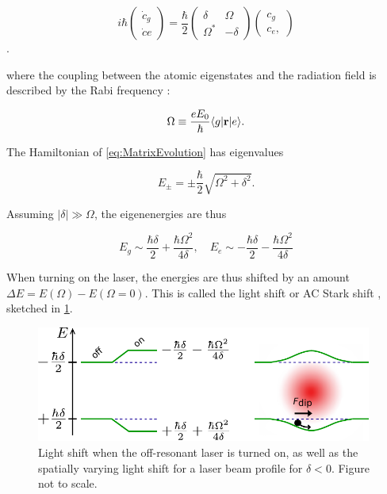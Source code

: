 \begin{equation}\label{eq:MatrixEvolution}
	i \hbar \begin{pmatrix}
		\dot{c}_g \\ 
		\dot{c}e
	\end{pmatrix}
	= \frac{\hbar}{2} \begin{pmatrix}
		\delta & \Omega \\ \Omega^* & -\delta 
	\end{pmatrix} 
	\begin{pmatrix}
		c_g \\ c_e,
	\end{pmatrix}
\end{equation}.

where the coupling between the atomic eigenstates and the radiation field is described by the Rabi frequency \cite{Metcalf1999}:

\begin{equation}\label{eq:RabiFrequencyMain}
	\Omega \equiv \frac{e E_0}{\hbar} \langle g\rvert\mathbf{r}\lvert e\rangle.
\end{equation}

The Hamiltonian of \cref{eq:MatrixEvolution} has eigenvalues 

\begin{equation}\label{eq:EigenValues}
	E_{\pm} = \pm
	\frac{\hbar}{2} \sqrt{\Omega^2+\delta^2}.
\end{equation}

Assuming $|\delta| \gg \Omega$, the eigenenergies are thus 

\begin{equation}\label{eq:SemiClassicalEigenvalues}
	E_g \sim  \frac{\hbar \delta}{2} +\frac{\hbar \Omega^2}{4 \delta}, \quad
	E_e \sim -\frac{\hbar \delta}{2} -\frac{\hbar \Omega^2}{4 \delta}
\end{equation}

When turning on the laser, the energies are thus shifted by an amount $\Delta E = E(\Omega)-E(\Omega=0)$. This is called the light shift or AC Stark shift \cite{Metcalf1999}, sketched in \cref{fig:DipoleForce}.

\begin{figure}
    \centering
	\includegraphics[height=3.8cm]{figures/LightShift.pdf}
	\caption{Light shift when the off-resonant laser is turned on, as well as the spatially varying light shift for a laser beam profile for $\delta<0$. Figure not to scale.}
	\label{fig:DipoleForce}
\end{figure}


